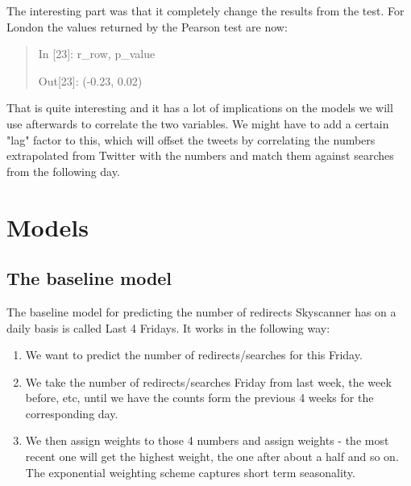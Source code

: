 \documentclass[minf,frontabs,twoside,singlespacing,parskip]{infthesis} %
\begin{document}
The interesting part was that it completely change the results from the test. For London the values returned by the Pearson test are now:

\begin{quotation}
In [23]: r\_row, p\_value

Out[23]: (-0.23, 0.02)
\end{quotation}

That is quite interesting and it has a lot of implications on the models we will use afterwards to correlate the two variables. 
We might have to add a certain "lag" factor to this, which will offset the tweets by correlating the numbers extrapolated from Twitter with the numbers and match them against searches from the following day.




\chapter{Models}

\section{The baseline model}

The baseline model for predicting the number of redirects Skyscanner has on a daily basis is called Last 4 Fridays. 
It works in the following way:
\begin{enumerate}
\item We want to predict the number of redirects/searches for this Friday.
\item We take the number of redirects/searches Friday from last week, the week before, etc, until we have the counts form the previous 4 weeks for the corresponding day.
\item We then assign weights to those 4 numbers and assign weights - the most recent one will get the highest weight, the one after about a half and so on. The exponential weighting scheme captures short term seasonality.
\end{enumerate}
\end{document}
